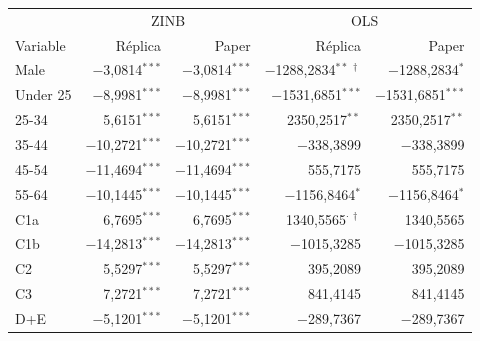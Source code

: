 \begin{tabular}{lrrrr}\toprule
 & \multicolumn{2}{c}{ZINB} & \multicolumn{2}{c}{OLS} \\
Variable & Réplica & Paper & Réplica & Paper \\\midrule
Male & $-$3,0814$^{***}$ & $-$3,0814$^{***}$ & $-$1288,2834$^{**\,\dagger}$ & $-$1288,2834$^{*}$ \\
Under 25 & $-$8,9981$^{***}$ & $-$8,9981$^{***}$ & $-$1531,6851$^{***}$ & $-$1531,6851$^{***}$ \\
25-34 & 5,6151$^{***}$ & 5,6151$^{***}$ & 2350,2517$^{**}$ & 2350,2517$^{**}$ \\
35-44 & $-$10,2721$^{***}$ & $-$10,2721$^{***}$ & $-$338,3899 & $-$338,3899 \\
45-54 & $-$11,4694$^{***}$ & $-$11,4694$^{***}$ & 555,7175 & 555,7175 \\
55-64 & $-$10,1445$^{***}$ & $-$10,1445$^{***}$ & $-$1156,8464$^{*}$ & $-$1156,8464$^{*}$ \\
C1a & 6,7695$^{***}$ & 6,7695$^{***}$ & 1340,5565$^{\cdot\,\dagger}$ & 1340,5565 \\
C1b & $-$14,2813$^{***}$ & $-$14,2813$^{***}$ & $-$1015,3285 & $-$1015,3285 \\
C2 & 5,5297$^{***}$ & 5,5297$^{***}$ & 395,2089 & 395,2089 \\
C3 & 7,2721$^{***}$ & 7,2721$^{***}$ & 841,4145 & 841,4145 \\
D+E & $-$5,1201$^{***}$ & $-$5,1201$^{***}$ & $-$289,7367 & $-$289,7367 \\
\bottomrule\end{tabular}
